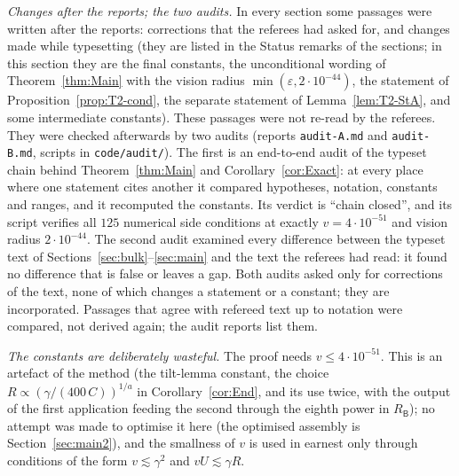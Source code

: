 \begin{remark}
\emph{Changes after the reports; the two audits.} In every section some passages were written after the reports: corrections that
the referees had asked for, and changes made while typesetting (they are listed in the Status remarks of the sections; in this
section they are the final constants, the unconditional wording of Theorem~\ref{thm:Main} with the vision radius
$\min(\varepsilon,2\cdot10^{-44})$, the statement of Proposition~\ref{prop:T2-cond}, the separate statement of
Lemma~\ref{lem:T2-StA}, and some intermediate constants). These passages were not re-read by the referees. They were checked
afterwards by two audits (reports \texttt{audit-A.md} and \texttt{audit-B.md}, scripts in \texttt{code/audit/}). The first is an
end-to-end audit of the typeset chain behind Theorem~\ref{thm:Main} and Corollary~\ref{cor:Exact}: at every place where one
statement cites another it compared hypotheses, notation, constants and ranges, and it recomputed the constants. Its verdict is
``chain closed'', and its script verifies all $125$ numerical side conditions at exactly $v=4\cdot10^{-51}$ and vision radius
$2\cdot10^{-44}$. The second audit examined every difference between the typeset text of
Sections~\ref{sec:bulk}--\ref{sec:main} and the text the referees had read: it found no difference that is false or leaves a
gap. Both audits asked only for corrections of the text, none of which changes a statement or a constant; they are incorporated.
Passages that agree with refereed text up to
notation were compared, not derived again; the audit reports list them.

\emph{The constants are deliberately wasteful.} The proof needs $v\le4\cdot10^{-51}$. This is an artefact of the method (the
tilt-lemma constant, the choice $R\propto(\gamma/(400\,C))^{1/a}$ in Corollary~\ref{cor:End}, and its use twice, with the output
of the first application feeding the second through the eighth power in $R_{\mathsf B}$); no attempt was made to optimise it
here (the optimised assembly is Section~\ref{sec:main2}), and
the smallness of $v$ is used in earnest only through conditions of the form $v\lesssim\gamma^2$ and $vU\lesssim\gamma R$.


\end{remark}
